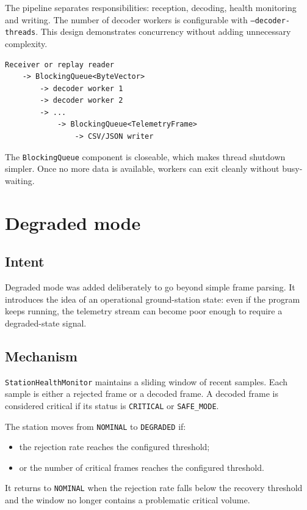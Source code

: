\documentclass[11pt,a4paper]{article}
\newcommand{\code}[1]{\texttt{#1}}
\begin{document}
The pipeline separates responsibilities: reception, decoding, health monitoring and writing. The number of decoder workers is configurable with \code{--decoder-threads}. This design demonstrates concurrency without adding unnecessary complexity.

\begin{lstlisting}
Receiver or replay reader
    -> BlockingQueue<ByteVector>
        -> decoder worker 1
        -> decoder worker 2
        -> ...
            -> BlockingQueue<TelemetryFrame>
                -> CSV/JSON writer
\end{lstlisting}

The \code{BlockingQueue} component is closeable, which makes thread shutdown simpler. Once no more data is available, workers can exit cleanly without busy-waiting.

\section{Degraded mode}

\subsection{Intent}

Degraded mode was added deliberately to go beyond simple frame parsing. It introduces the idea of an operational ground-station state: even if the program keeps running, the telemetry stream can become poor enough to require a degraded-state signal.

\subsection{Mechanism}

\code{StationHealthMonitor} maintains a sliding window of recent samples. Each sample is either a rejected frame or a decoded frame. A decoded frame is considered critical if its status is \code{CRITICAL} or \code{SAFE\_MODE}.

The station moves from \code{NOMINAL} to \code{DEGRADED} if:

\begin{itemize}[nosep]
    \item the rejection rate reaches the configured threshold;
    \item or the number of critical frames reaches the configured threshold.
\end{itemize}

It returns to \code{NOMINAL} when the rejection rate falls below the recovery threshold and the window no longer contains a problematic critical volume.
\end{document}
